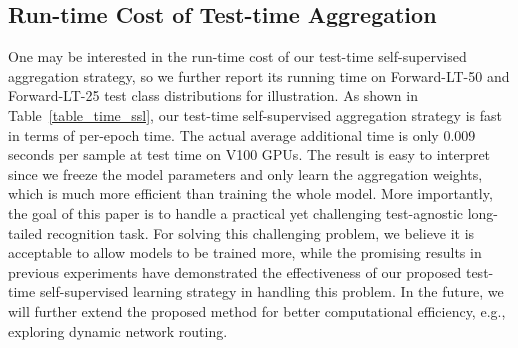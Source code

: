 \documentclass{article}
\begin{document}
 
 
 

\subsection{Run-time Cost  of Test-time Aggregation}

One may be interested in the run-time cost of our   test-time self-supervised aggregation strategy, so we further report its running time  on Forward-LT-50 and Forward-LT-25 test class distributions for illustration. As shown in Table~\ref{table_time_ssl}, our  test-time self-supervised aggregation strategy is   fast in terms of  per-epoch time. The actual average additional time is only 0.009 seconds per sample at test time on  V100 GPUs. 
The result    is   easy to interpret since we freeze the model parameters and only learn the aggregation weights, which  is much more efficient than     training  the whole model. More importantly,  the goal of this paper is to handle  a   practical  yet challenging   test-agnostic long-tailed recognition task.  For solving this  challenging  problem, we believe it is acceptable  to allow models to be trained more, while the promising results  in previous experiments have demonstrated   the effectiveness of our proposed test-time self-supervised  learning strategy in  handling this problem. In the future, we will further extend the proposed method for better computational efficiency, e.g., exploring dynamic network routing. 
 
 \begin{table}[h]  
  \caption{Run-time cost of our   test-time self-supervised  aggregation   strategy   on ImageNet-LT, compared to the run-time cost of model training. Here, we   show two test class distributions for illustration, which have different numbers of test samples.}  
  \label{table_time_ssl}  
 \begin{center} 
 \begin{threeparttable} 
	 \end{threeparttable}
	 \end{center}   
\end{table} 
  
\end{document}
